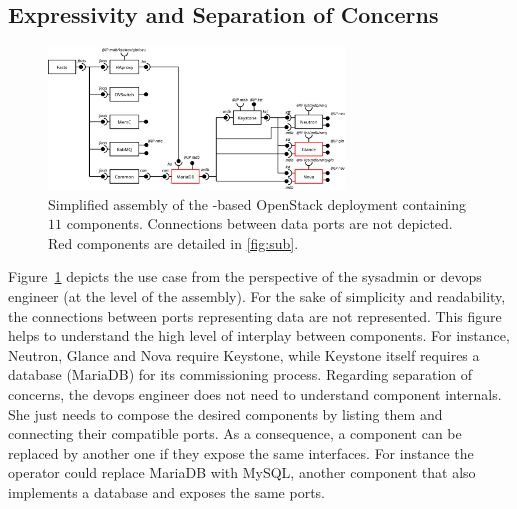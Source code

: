 \subsection{Expressivity and Separation of Concerns}

\begin{figure}
  \begin{center}
    \includegraphics[width=0.7\textwidth]{./images/full2.pdf}
    \caption{Simplified \mad assembly of the \kolla-based OpenStack deployment
    containing $11$ components. Connections between data ports are not depicted.
    Red components are detailed in \cref{fig:sub}.}
    \label{fig:full}
  \end{center}
\end{figure}

Figure~\ref{fig:full} depicts the use case from the perspective of the sysadmin or devops engineer 
(\ie at the level of the \mad assembly). For the sake of simplicity and 
readability, the connections between ports representing data are not represented. 
This figure helps to understand the high level of interplay between components. 
For instance, Neutron, Glance and Nova require Keystone, while Keystone itself requires 
a database (\ie MariaDB) for its commissioning process. Regarding
separation of concerns, the devops engineer does not need to understand component 
internals. She just needs to compose the desired components by listing them and 
connecting their compatible ports. As a consequence, a component can be replaced 
by another one if they expose the same interfaces. For instance the operator could 
replace MariaDB with MySQL, another component that also implements a database and
exposes the same ports.

